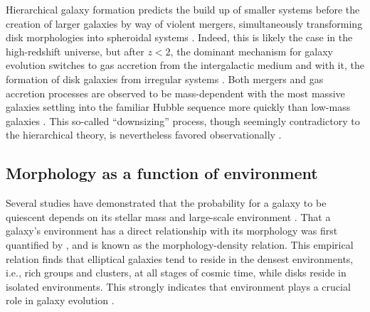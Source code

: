 

Hierarchical galaxy formation predicts the build up of smaller systems before the creation of larger galaxies by way of violent mergers, simultaneously transforming disk morphologies into spheroidal systems \citep{Driver2013,Bluck2009,Man2012}. Indeed, this is likely the case in the high-redshift universe, but after $z<2$, the dominant mechanism for galaxy evolution switches to gas accretion from the intergalactic medium and with it, the formation of disk galaxies from irregular systems \citep{Conselice2013}. Both mergers and gas accretion processes are observed to be mass-dependent with the most massive galaxies settling into the familiar Hubble sequence more quickly than low-mass galaxies \citep{Buitrago2013,Conselice2011,Mortlock2013}. This so-called ``downsizing'' process, though seemingly contradictory to the hierarchical theory, is nevertheless favored observationally \citep{Cowie1996, Brinchmann2000, Bundy2005, Cimatti2006}. 



\subsection{Morphology as a function of environment}
\label{chap1: environment}

Several studies have demonstrated that the probability for a galaxy to be quiescent depends on its stellar mass and large-scale environment \citep{Balogh2004, Hogg2004, Peng2010, Woo2013}. That a galaxy's environment has a direct relationship with its morphology was first quantified by \cite{Dressler1980}, and is known as the morphology-density relation. This empirical relation finds that elliptical galaxies tend to reside in the densest environments, i.e., rich groups and clusters, at all stages of cosmic time, while disks reside in isolated environments. This strongly indicates that environment plays a crucial role in galaxy evolution \citep[e.g.,][]{Fasano2000, Smith2005, Peng2010}. 

